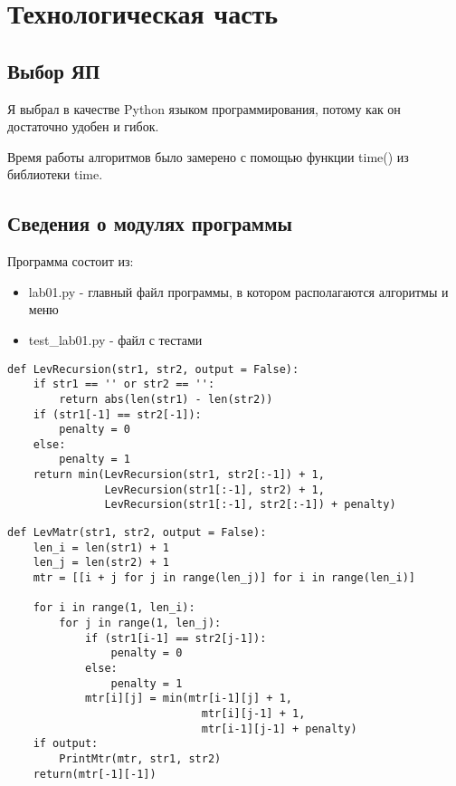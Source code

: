 \documentclass[12pt]{report}
\begin{document}
\chapter{Технологическая часть}
\section{Выбор ЯП}
Я выбрал в качестве Python языком программирования, потому как он достаточно удобен и гибок.

Время работы алгоритмов было замерено с помощью функции time() из библиотеки time.

\section{Сведения о модулях программы}
Программа состоит из:
\begin{itemize}
	\item lab01.py - главный файл программы, в котором располагаются алгоритмы и меню
	\item test_lab01.py - файл с тестами 
\end{itemize}

\begin{lstlisting}[label=some-code,caption=Функция нахождения расстояния Левенштейна рекурсивно]
def LevRecursion(str1, str2, output = False):
    if str1 == '' or str2 == '':
        return abs(len(str1) - len(str2))
    if (str1[-1] == str2[-1]):
        penalty = 0
    else:
        penalty = 1
    return min(LevRecursion(str1, str2[:-1]) + 1,
               LevRecursion(str1[:-1], str2) + 1,
               LevRecursion(str1[:-1], str2[:-1]) + penalty)
\end{lstlisting}

\begin{lstlisting}[label=some-code,caption=Функция нахождения расстояния Левенштейна матрично]
def LevMatr(str1, str2, output = False):
    len_i = len(str1) + 1
    len_j = len(str2) + 1
    mtr = [[i + j for j in range(len_j)] for i in range(len_i)]

    for i in range(1, len_i):
        for j in range(1, len_j):
            if (str1[i-1] == str2[j-1]):
                penalty = 0
            else:
                penalty = 1
            mtr[i][j] = min(mtr[i-1][j] + 1,
                              mtr[i][j-1] + 1,
                              mtr[i-1][j-1] + penalty)
    if output:
        PrintMtr(mtr, str1, str2)
    return(mtr[-1][-1])
\end{lstlisting}
\end{document}
